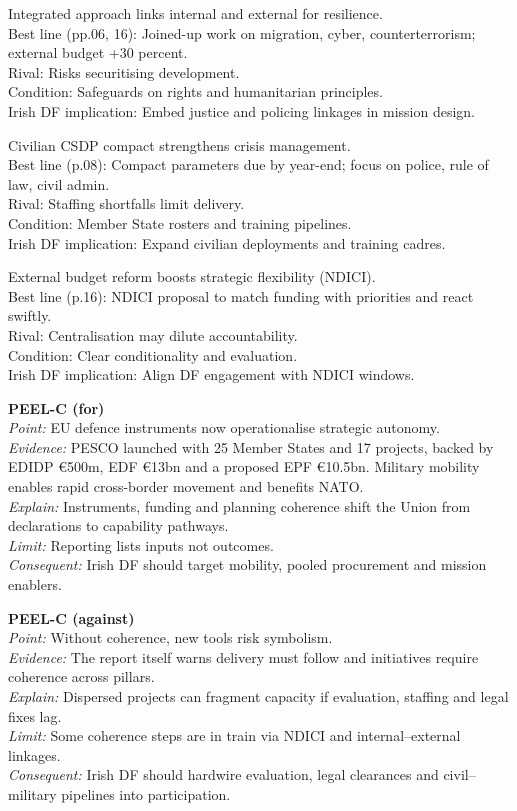 Integrated approach links internal and external for resilience.\\
Best line (pp.06, 16): Joined-up work on migration, cyber, counterterrorism; external budget +30 percent.\\
Rival: Risks securitising development.\\
Condition: Safeguards on rights and humanitarian principles.\\
Irish DF implication: Embed justice and policing linkages in mission design.

Civilian CSDP compact strengthens crisis management.\\
Best line (p.08): Compact parameters due by year-end; focus on police, rule of law, civil admin.\\
Rival: Staffing shortfalls limit delivery.\\
Condition: Member State rosters and training pipelines.\\
Irish DF implication: Expand civilian deployments and training cadres.

External budget reform boosts strategic flexibility (NDICI).\\
Best line (p.16): NDICI proposal to match funding with priorities and react swiftly.\\
Rival: Centralisation may dilute accountability.\\
Condition: Clear conditionality and evaluation.\\
Irish DF implication: Align DF engagement with NDICI windows.

\textbf{PEEL-C (for)}\\
\textit{Point:} EU defence instruments now operationalise strategic autonomy.\\
\textit{Evidence:} PESCO launched with 25 Member States and 17 projects, backed by EDIDP €500m, EDF €13bn and a proposed EPF €10.5bn. Military mobility enables rapid cross-border movement and benefits NATO.\\
\textit{Explain:} Instruments, funding and planning coherence shift the Union from declarations to capability pathways.\\
\textit{Limit:} Reporting lists inputs not outcomes.\\
\textit{Consequent:} Irish DF should target mobility, pooled procurement and mission enablers.

\textbf{PEEL-C (against)}\\
\textit{Point:} Without coherence, new tools risk symbolism.\\
\textit{Evidence:} The report itself warns delivery must follow and initiatives require coherence across pillars.\\
\textit{Explain:} Dispersed projects can fragment capacity if evaluation, staffing and legal fixes lag.\\
\textit{Limit:} Some coherence steps are in train via NDICI and internal–external linkages.\\
\textit{Consequent:} Irish DF should hardwire evaluation, legal clearances and civil–military pipelines into participation.

